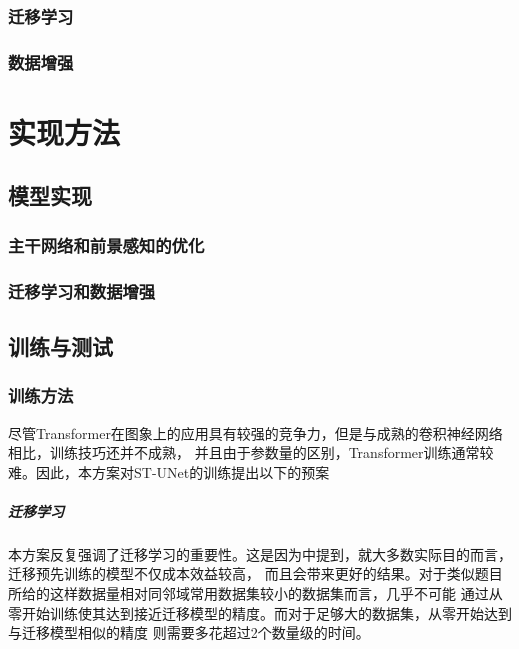 \documentclass[a4paper,twoside,zihao=5,UTF8]{ctexrep}
\begin{document}
\section{迁移学习}
\blindtext

\section{数据增强}
\blindtext


\part{实现方法}

\chapter{模型实现}

\section{主干网络和前景感知的优化}
\blindtext

\section{迁移学习和数据增强}
\blindtext

\chapter{训练与测试}

\section{训练方法}
尽管Transformer在图象上的应用具有较强的竞争力，但是与成熟的卷积神经网络相比，训练技巧还并不成熟\cite{howtotrain}，
并且由于参数量的区别，Transformer训练通常较难。因此，本方案对ST-UNet的训练提出以下的预案

\subsubsection{迁移学习}

本方案反复强调了迁移学习的重要性。这是因为\cite{howtotrain}中提到，就大多数实际目的而言，迁移预先训练的模型不仅成本效益较高，
而且会带来更好的结果。对于类似题目所给的这样数据量相对同邻域常用数据集较小的数据集而言，几乎不可能
通过从零开始训练使其达到接近迁移模型的精度。而对于足够大的数据集，从零开始达到与迁移模型相似的精度
则需要多花超过2个数量级的时间。
\end{document}
